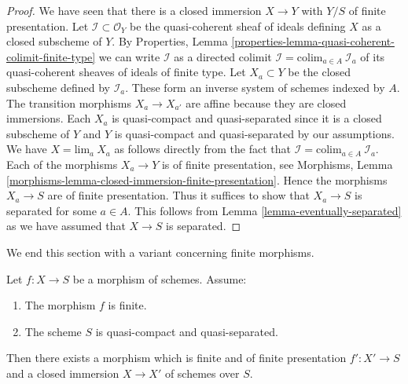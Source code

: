 \begin{proof}
We have seen that there is a closed immersion $X \to Y$ with $Y/S$ of
finite presentation. Let $\mathcal{I} \subset \mathcal{O}_Y$
be the quasi-coherent sheaf of ideals defining $X$ as a closed
subscheme of $Y$. By
Properties, Lemma \ref{properties-lemma-quasi-coherent-colimit-finite-type}
we can write $\mathcal{I}$ as a directed colimit
$\mathcal{I} = \text{colim}_{a \in A}\ \mathcal{I}_a$ of its
quasi-coherent sheaves of ideals of finite type.
Let $X_a \subset Y$ be the closed subscheme defined by $\mathcal{I}_a$.
These form an inverse system of schemes indexed by $A$.
The transition morphisms $X_a \to X_{a'}$ are affine because
they are closed immersions. Each $X_a$ is quasi-compact and quasi-separated
since it is a closed subscheme of $Y$ and $Y$ is quasi-compact and
quasi-separated by our assumptions.
We have $X = \text{lim}_a\ X_a$ as follows directly from the
fact that $\mathcal{I} = \text{colim}_{a \in A}\ \mathcal{I}_a$.
Each of the morphisms $X_a \to Y$ is of finite presentation, see
Morphisms, Lemma \ref{morphisms-lemma-closed-immersion-finite-presentation}.
Hence the morphisms $X_a \to S$ are of finite presentation.
Thus it suffices to show that $X_a \to S$ is separated for some
$a \in A$. This follows from Lemma \ref{lemma-eventually-separated} as we have
assumed that $X \to S$ is separated.
\end{proof}

\noindent
We end this section with a variant concerning finite morphisms.

\begin{lemma}
\label{lemma-finite-closed-in-finite-finite-presentation}
Let $f : X \to S$ be a morphism of schemes.
Assume:
\begin{enumerate}
\item The morphism $f$ is finite.
\item The scheme $S$ is quasi-compact and quasi-separated.
\end{enumerate}
Then there exists a morphism which is finite and of finite presentation
$f' : X' \to S$ and a closed immersion $X \to X'$ of schemes over $S$.
\end{lemma}

